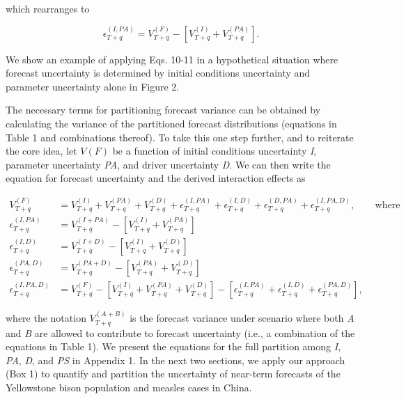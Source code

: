 \documentclass[12pt,]{article}
\begin{document}
\noindent{}which rearranges to

\begin{equation}
\epsilon_{T+q}^{(I,PA)} = V^{(F)}_{T+q} - \left[ V^{(I)}_{T+q} + V^{(PA)}_{T+q} \right].
\end{equation}

\noindent{}We show an example of applying Eqs. 10-11 in a hypothetical
situation where forecast uncertainty is determined by initial conditions
uncertainty and parameter uncertainty alone in Figure 2.

The necessary terms for partitioning forecast variance can be obtained
by calculating the variance of the partitioned forecast distributions
(equations in Table 1 and combinations thereof). To take this one step
further, and to reiterate the core idea, let \(V(F)\) be a function of
initial conditions uncertainty \emph{I}, parameter uncertainty
\emph{PA}, and driver uncertainty \emph{D}. We can then write the
equation for forecast uncertainty and the derived interaction
effects
as

\begin{align}
V^{(F)}_{T+q} &= V^{(I)}_{T+q} + V^{(PA)}_{T+q} + V^{(D)}_{T+q} + \epsilon^{(I,PA)}_{T+q} + \epsilon^{(I,D)}_{T+q} + \epsilon^{(D,PA)}_{T+q} + \epsilon^{(I,PA,D)}_{T+q}, \qquad \text{where} \\
\epsilon^{(I,PA)}_{T+q} &= V^{(I+PA)}_{T+q} - \left[V^{(I)}_{T+q} + V^{(PA)}_{T+q}\right] \\
\epsilon^{(I,D)}_{T+q} &= V^{(I+D)}_{T+q} - \left[V^{(I)}_{T+q} + V^{(D)}_{T+q}\right] \\
\epsilon^{(PA,D)}_{T+q} &= V^{(PA+D)}_{T+q} - \left[V^{(PA)}_{T+q} + V^{(D)}_{T+q}\right] \\
\epsilon^{(I,PA,D)}_{T+q} &= V^{(F)}_{T+q} - \left[V^{(I)}_{T+q} + V^{(PA)}_{T+q} + V^{(D)}_{T+q}\right] - \left[\epsilon^{(I,PA)}_{T+q} + \epsilon^{(I,D)}_{T+q} + \epsilon^{(PA,D)}_{T+q} \right],
\end{align}

\noindent{}where the notation \(V^{(A+B)}_{T+q}\) is the forecast
variance under scenario where both \emph{A} and \emph{B} are allowed to
contribute to forecast uncertainty (i.e., a combination of the equations
in Table 1). We present the equations for the full partition among
\emph{I}, \emph{PA}, \emph{D}, and \emph{PS} in Appendix 1. In the next
two sections, we apply our approach (Box 1) to quantify and partition
the uncertainty of near-term forecasts of the Yellowstone bison
population and measles cases in China.
\end{document}
